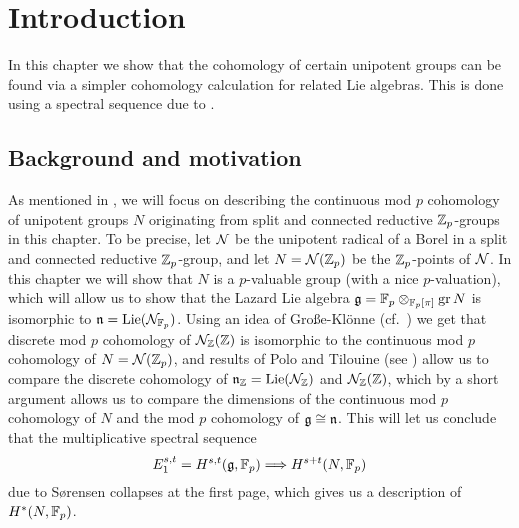 \section{Introduction}%
\label{sec:cohunigps-intro}

In this chapter we show that the cohomology of certain unipotent groups can be found via a simpler cohomology calculation for related Lie algebras. This is done using a spectral sequence due to \cite{Sor}.

\subsection{Background and motivation}


As mentioned in , we will focus on describing the continuous mod $p$ cohomology of unipotent groups $N$ originating from split and connected reductive $\mathbb{Z}_p$-groups in this chapter. To be precise, let $\mathcal{N}$ be the unipotent radical of a Borel in a split and connected reductive $\mathbb{Z}_{p}$-group, and let $N = \mathcal{N}(\mathbb{Z}_{p})$ be the $\mathbb{Z}_{p}$-points of $\mathcal{N}$. In this chapter we will show that $N$ is a $p$-valuable group (with a nice $p$-valuation), which will allow us to show that the Lazard Lie algebra $\mathfrak{g} = \mathbb{F}_{p} \otimes_{\mathbb{F}_{p}[\pi]} \operatorname{gr} N$ is isomorphic to $\mathfrak{n} = \operatorname{Lie}(\mathcal{N}_{\mathbb{F}_{p}})$. Using an idea of Große-Klönne (cf.\ \cite[Sect.~7]{GK}) we get that discrete mod $p$ cohomology of $\mathcal{N}_{\mathbb{Z}}(\mathbb{Z})$ is isomorphic to the continuous mod $p$ cohomology of $N = \mathcal{N}(\mathbb{Z}_{p})$, and results of Polo and Tilouine (see \cite{PT}) allow us to compare the discrete cohomology of $\mathfrak{n}_{\mathbb{Z}} = \operatorname{Lie}(\mathcal{N}_{\mathbb{Z}})$ and $\mathcal{N}_{\mathbb{Z}}(\mathbb{Z})$, which by a short argument allows us to compare the dimensions of the continuous mod $p$ cohomology of $N$ and the mod $p$ cohomology of $\mathfrak{g} \cong \mathfrak{n}$. This will let us conclude that the multiplicative spectral sequence \[ E_{1}^{s,t} = H^{s,t}(\mathfrak{g},\mathbb{F}_{p}) \Longrightarrow H^{s+t}(N,\mathbb{F}_{p}) \] due to Sørensen collapses at the first page, which gives us a description of $H^{*}(N,\mathbb{F}_{p})$.


